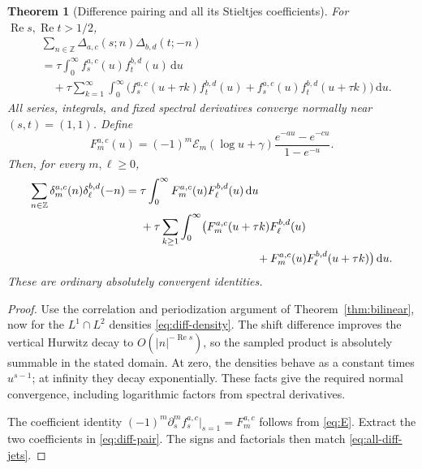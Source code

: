 \documentclass[11pt,a4paper]{article}
\numberwithin{equation}{section}
\newtheorem{theorem}{Theorem}[section]
\theoremstyle{definition}
\theoremstyle{remark}
\DeclareMathOperator{\Ree}{Re}
\newcommand{\dd}{\,\mathrm d}
\newcommand{\Z}{\mathbb Z}
\newcommand{\Ecal}{\mathcal E}
\begin{document}
\begin{theorem}[Difference pairing and all its Stieltjes coefficients]
\label{thm:diff-jets}
For $\Ree s,\Ree t>1/2$,
\begin{equation}\label{eq:diff-pair}
 \begin{split}
 &\sum_{n\in\Z}\Delta_{a,c}(s;n)\Delta_{b,d}(t;-n)\\
 &=\tau\int_0^\infty f_s^{a,c}(u)f_t^{b,d}(u)\dd u\\
 &\quad+\tau\sum_{k=1}^\infty\int_0^\infty
   \bigl(f_s^{a,c}(u+\tau k)f_t^{b,d}(u)
        +f_s^{a,c}(u)f_t^{b,d}(u+\tau k)\bigr)\dd u.
 \end{split}
\end{equation}
All series, integrals, and fixed spectral derivatives converge
normally near $(s,t)=(1,1)$. Define
\begin{equation}\label{eq:Stieltjes-density}
 F_m^{a,c}(u)=(-1)^m\Ecal_m(\log u+\gamma)
                        \frac{e^{-au}-e^{-cu}}{1-e^{-u}}.
\end{equation}
Then, for every $m,\ell\ge0$,
\begin{equation}\label{eq:all-diff-jets}
 \begin{split}
 \sum_{n\in\Z}\delta_m^{a,c}(n)\delta_\ell^{b,d}(-n)
 ={}&\tau\int_0^\infty F_m^{a,c}(u)F_\ell^{b,d}(u)\dd u\\
 &+\tau\sum_{k\ge1}\int_0^\infty
   \bigl(F_m^{a,c}(u+\tau k)F_\ell^{b,d}(u)\\
 &\hspace{36mm}+F_m^{a,c}(u)F_\ell^{b,d}(u+\tau k)\bigr)\dd u.
 \end{split}
\end{equation}
These are ordinary absolutely convergent identities.
\end{theorem}
\begin{proof}
Use the correlation and periodization argument of
Theorem~\ref{thm:bilinear}, now for the $L^1\cap L^2$ densities
\eqref{eq:diff-density}. The shift difference improves the vertical
Hurwitz decay to $O(|n|^{-\Ree s})$, so the sampled product is
absolutely summable in the stated domain. At zero, the densities
behave as a constant times $u^{s-1}$; at infinity they decay
exponentially. These facts give the required normal convergence,
including logarithmic factors from spectral derivatives.

The coefficient identity
$(-1)^m\partial_s^m f_s^{a,c}|_{s=1}=F_m^{a,c}$ follows from
\eqref{eq:E}. Extract the two coefficients in \eqref{eq:diff-pair}.
The signs and factorials then match \eqref{eq:all-diff-jets}.
\end{proof}
\end{document}
